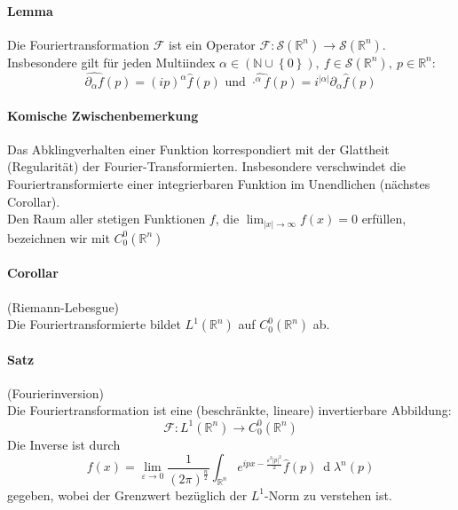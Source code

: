 \documentclass[12pt,a4paper,fleqn]{article}
\def\abs#1{{\left\vert #1 \right\vert}}
\def\set#1{{\left\{ #1 \right\}}}
\def\R{{\mathbb{R}}}
\def\d{{\operatorname{d}}}
\begin{document}
\paragraph{Lemma} Die Fouriertransformation $\mathscr{F}$ ist ein Operator $\mathscr{F}\colon \mathscr{S}(\R^n) \rightarrow \mathscr{S}(\R^n)$. Insbesondere gilt für jeden Multiindex $\alpha \in (\mathbb{N} \cup \set{0}),\ f \in \mathscr{S}(\R^n),\ p \in \R^n$:
\begin{displaymath}
\widehat{\partial_\alpha f}(p) = (ip)^\alpha \widehat{f}(p) \text{ und } \widehat{\cdot^\alpha f}(p) = i^{\abs{\alpha}}\partial_\alpha\widehat{f}(p)
\end{displaymath}

\paragraph{Komische Zwischenbemerkung} Das Abklingverhalten einer Funktion korrespondiert mit der Glattheit (Regularität) der Fourier-Transformierten. Insbesondere verschwindet die Fouriertransformierte einer integrierbaren Funktion im Unendlichen (nächstes Corollar).\\
Den Raum aller stetigen Funktionen $f$, die $\lim_{\abs{x} \rightarrow \infty} f(x) = 0$ erfüllen, bezeichnen wir mit $C^0_0(\R^n)$

\paragraph{Corollar} (Riemann-Lebesgue)\\
Die Fouriertransformierte bildet $L^1(\R^n)$ auf $C^0_0(\R^n)$ ab.

\paragraph{Satz} (Fourierinversion)\\
Die Fouriertransformation ist eine (beschränkte, lineare) invertierbare Abbildung:
\begin{displaymath}
\mathscr{F}: L^1(\R^n) \rightarrow C^0_0(\R^n)
\end{displaymath}
Die Inverse ist durch
\begin{displaymath}
f(x) = \lim_{\varepsilon\rightarrow 0} \frac{1}{(2\pi)^\frac{n}{2}} \int_{\R^n} e^{ipx-\frac{\varepsilon^2\abs{p}^2}{2}}\widehat{f}(p)\ \d\lambda^n(p)
\end{displaymath}
gegeben, wobei der Grenzwert bezüglich der $L^1$-Norm zu verstehen ist.
\end{document}
